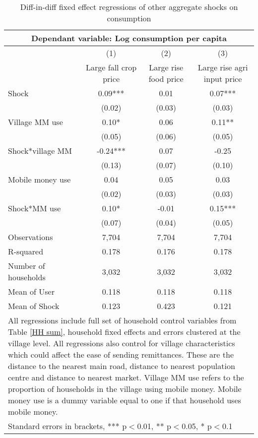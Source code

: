 \begin{table}
\centering \caption{Diff-in-diff fixed effect regressions of other aggregate shocks on consumption} \label{other shocks}
\begin{tabular}{lccc} 
\multicolumn{4}{c}{Dependant variable: Log consumption per capita}\\ \hline
 & (1) & (2) & (3) \\
 & Large fall crop price & Large rise food price & Large rise agri input price \\ \hline
Shock & 0.09*** & 0.01  & 0.07***  \\
 & (0.02) & (0.03)  & (0.03)  \\
Village MM use & 0.10* & 0.06 & 0.11** \\
 & (0.05) & (0.06) & (0.05) \\
Shock*village MM & -0.24*** & 0.07   & -0.25  \\
 & (0.13)  & (0.07)  & (0.10) \\
Mobile money use & 0.04 & 0.05 & 0.03 \\
 & (0.02) & (0.03) & (0.03) \\
Shock*MM use & 0.10* & -0.01  & 0.15***
  \\
 & (0.07) & (0.04)  & (0.05) \\

Observations & 7,704 & 7,704 & 7,704 \\
R-squared & 0.178 & 0.176 & 0.178 \\
Number of households & 3,032 & 3,032 & 3,032 \\
  \hline
Mean of User & 0.118 & 0.118 & 0.118 \\
 Mean of Shock & 0.123 & 0.423 & 0.121 \\ \hline
\multicolumn{4}{p{14cm}}{ All regressions include full set of household control variables from Table \ref{HH sum}, household fixed effects and errors clustered at the village level. All regressions also control for village characteristics which could affect the ease of sending remittances. These are the distance to the nearest main road, distance to nearest population centre and distance to nearest market. Village MM use refers to the proportion of households in the village using mobile money. Mobile money use is a dummy variable equal to one if that household uses mobile money. } \\
\multicolumn{4}{l}{ Standard errors in brackets, *** p$<$0.01, ** p$<$0.05, * p$<$0.1} \\
\end{tabular}
\end{table}